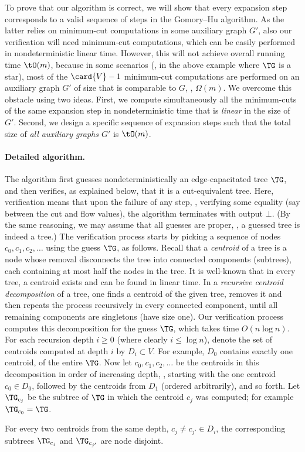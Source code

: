 To prove that our algorithm is correct, we will show that every expansion step
corresponds to a valid sequence of steps in the Gomory--Hu algorithm.
As the latter relies on minimum-cut computations in some auxiliary graph $G'$,
also our verification will need minimum-cut computations,
which can be easily performed in nondeterministic linear time.
However, this will not achieve overall running time $\tO(m)$,
because in some scenarios (\eg, in the above example where $\TG$ is a star),
most of the $\card{V}-1$ minimum-cut computations are performed
on an auxiliary graph $G'$ of size that is comparable to $G$, \ie, $\Omega(m)$.
We overcome this obstacle using two ideas.
First, we compute simultaneously all the minimum-cuts of the same expansion step
in nondeterministic time that is \emph{linear} in the size of $G'$.
Second, we design a specific sequence of expansion steps
such that the total size of \emph{all auxiliary graphs $G'$} is $\tO(m)$.

\paragraph{Detailed algorithm.}

The algorithm first guesses nondeterministically an edge-capacitated tree $\TG$,
and then verifies, as explained below, that it is a cut-equivalent tree.
Here, verification means that upon the failure of any step,
\eg, verifying some equality (say between the cut and flow values),
the algorithm terminates with output $\bot$.
(By the same reasoning, we may assume that all guesses are proper,
\eg, a guessed tree is indeed a tree.)
%
The verification process starts by picking
a sequence of nodes $c_0,c_1,c_2,\ldots$ using the guess $\TG$,
as follows.
Recall that a \emph{centroid} of a tree is a node
whose removal disconnects the tree into connected components (subtrees),
each containing at most half the nodes in the tree.
It is well-known that in every tree,
a centroid exists and can be found in linear time.
In a \emph{recursive centroid decomposition} of a tree,
one finds a centroid of the given tree, removes it
and then repeats the process recursively in every connected component,
until all remaining components are singletons (have size one).
Our verification process computes this decomposition for the guess $\TG$,
which takes time $O(n\log n)$.
For each recursion depth $i\ge 0$ (where clearly $i\le \log n$),
denote the set of centroids computed at depth $i$ by $D_i\subset V$.
For example, $D_0$ contains exactly one centroid, of the entire $\TG$.
Now let $c_0,c_1,c_2,\ldots$ be the centroids in this decomposition
in order of increasing depth, \ie, starting with the one centroid $c_0\in D_0$,
followed by the centroids from $D_1$ (ordered arbitrarily), and so forth.
Let $\TG_{c_j}$ be the subtree of $\TG$ in which the centroid $c_j$ was computed; for example $\TG_{c_0}=\TG$.
\begin{observation}\label{observation:disjoint}
For every two centroids from the same depth,
$c_j\neq c_{j'}\in D_i$,
the corresponding subtrees $\TG_{c_j}$ and $\TG_{c_{j'}}$ are node disjoint.
\end{observation}

